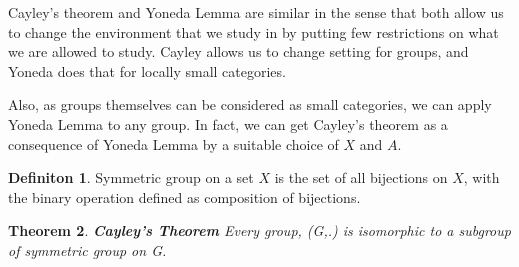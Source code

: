 \documentclass[18pt,a4paper]{article}
\newtheorem{theorem}{Theorem}[section]
\theoremstyle{definition}
\newtheorem{definition}[theorem]{Definiton}
\begin{document}
Cayley's theorem and Yoneda Lemma are similar in the sense that both allow us to change the environment
that we study in by putting few restrictions on what we are allowed to study. Cayley allows us to
change setting for groups, and Yoneda does that for locally small categories.

Also, as groups themselves can be considered as small categories, we can apply Yoneda Lemma to any
group. In fact, we can get Cayley's theorem as a consequence of Yoneda Lemma by a suitable
choice of $X$ and $A$.
\begin{definition} %
	Symmetric group on a set $X$ is the set of all bijections on $X$, with the binary operation
	defined as composition of bijections.
\end{definition}
\begin{theorem}{\textbf{Cayley's Theorem}} %
	Every group, (G,.) is isomorphic to a subgroup of symmetric group on G.
\end{theorem}
\end{document}
